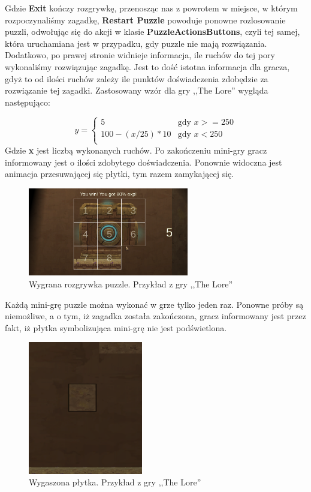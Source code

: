 \documentclass[oneside,polski,logo]{amuthesis}
\begin{document}
Gdzie \textbf{Exit} kończy rozgrywkę, przenosząc nas z powrotem w miejsce, w którym rozpoczynaliśmy zagadkę, \textbf{Restart Puzzle} powoduje ponowne rozlosowanie puzzli, odwołując się do akcji w klasie \textbf{PuzzleActionsButtons}, czyli tej samej, która uruchamiana jest w przypadku, gdy puzzle nie mają rozwiązania. Dodatkowo, po prawej stronie widnieje informacja, ile ruchów do tej pory wykonaliśmy rozwiązując zagadkę. Jest to dość istotna informacja dla gracza, gdyż to od ilości ruchów zależy ile punktów doświadczenia zdobędzie za rozwiązanie tej zagadki. Zastosowany wzór dla gry ,,The Lore'' wygląda następująco:

$$
y = \left\{ \begin{array}{ll}
5 & \textrm{gdy $x>=250$}\\
100 - (x / 25) * 10 & \textrm{gdy $x<250$}\\
\end{array} \right.
$$
Gdzie \textbf{x} jest liczbą wykonanych ruchów.
Po zakończeniu mini-gry gracz informowany jest o ilości zdobytego doświadczenia. Ponownie widoczna jest animacja przesuwającej się płytki, tym razem zamykającej się.
\begin{figure}[h]
	\centering
	\includegraphics[width=7cm]{images/tyrek/puzzle_end.png}
	\caption{Wygrana rozgrywka puzzle. Przykład z gry ,,The Lore''}
\end{figure}

Każdą mini-grę puzzle można wykonać w grze tylko jeden raz. Ponowne próby są niemożliwe, a o tym, iż zagadka została zakończona, gracz informowany jest przez fakt, iż płytka symbolizująca mini-grę nie jest podświetlona.

\begin{figure}[h]
	\centering
	\includegraphics[width=5cm]{images/tyrek/puzzleWin.png}
	\caption{Wygaszona płytka. Przykład z gry ,,The Lore''}
\end{figure}
\end{document}
